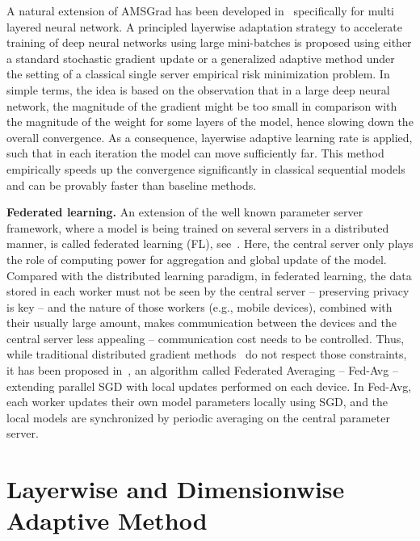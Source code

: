\documentclass[twoside]{article}
\begin{document}
A natural extension of AMSGrad has been developed in~\citet{you2019large} specifically for multi layered neural network. 
A principled layerwise adaptation strategy to accelerate training of deep neural networks using large mini-batches is proposed using either a standard stochastic gradient update or a generalized adaptive method under the setting of a classical single server empirical risk minimization problem. 
 In simple terms, the idea is based on the observation that in a large deep neural network, the magnitude of the gradient might be too small in comparison with the magnitude of the weight for some layers of the model, hence slowing down the overall convergence. 
As a consequence, layerwise adaptive learning rate is applied, such that in each iteration the model can move sufficiently far. 
This method empirically speeds up the convergence significantly in classical sequential models and can be provably faster than baseline methods.


\vspace{0.1in}
\noindent\textbf{Federated learning.}
An extension of the well known parameter server framework, where a model is being trained on several servers in a distributed manner, is called federated learning (FL), see~\citet{konevcny2016federated}.
Here, the central server only plays the role of computing power for aggregation and global update of the model.
Compared with the distributed learning paradigm, in federated learning, the data stored in each worker must not be seen by the central server -- preserving privacy is key -- and the nature of those workers (e.g., mobile devices), combined with their usually large amount, makes communication between the devices and the central server less appealing -- communication cost needs to be controlled.
Thus, while traditional distributed gradient methods~\citep{recht2011hogwild,li2014scaling,zhao2020distributed} do not respect those constraints, it has been proposed in~\citet{mcmahan2017communication}, an algorithm called Federated Averaging -- Fed-Avg -- extending parallel SGD with local updates performed on each device. 
In Fed-Avg, each worker updates their own model parameters locally using SGD, and the local models are synchronized by periodic averaging on the central parameter server.

\section{Layerwise and Dimensionwise Adaptive Method}\label{sec:main}
\end{document}
